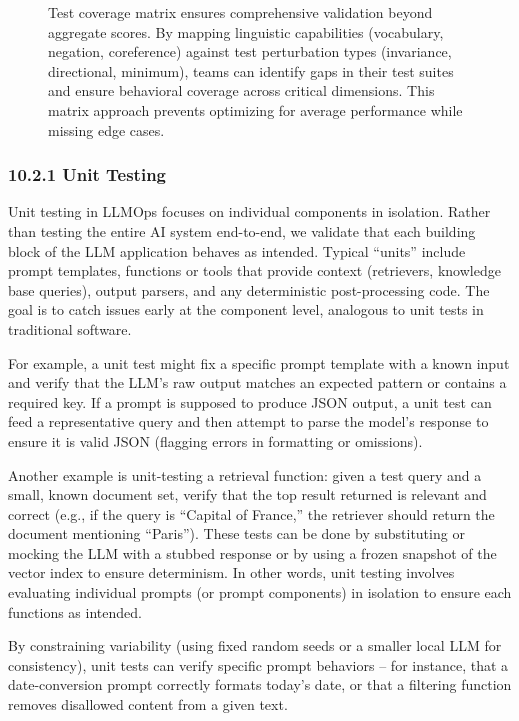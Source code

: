 \begin{figure}[t]
\begin{llmfigbox}
\begin{tikzpicture}[font=\normalsize, node distance=10mm]
\end{tikzpicture}
\end{llmfigbox}
\caption{Test coverage matrix ensures comprehensive validation beyond aggregate scores. By mapping linguistic capabilities (vocabulary, negation, coreference) against test perturbation types (invariance, directional, minimum), teams can identify gaps in their test suites and ensure behavioral coverage across critical dimensions. This matrix approach prevents optimizing for average performance while missing edge cases.}
\label{fig:ch10_test_coverage_matrix}
\end{figure}

\subsubsection*{10.2.1 Unit Testing}
Unit testing in LLMOps focuses on individual components in isolation. Rather than testing the entire AI system end-to-end, we validate that each building block of the LLM application behaves as intended. Typical “units” include prompt templates, functions or tools that provide context (retrievers, knowledge base queries), output parsers, and any deterministic post-processing code. The goal is to catch issues early at the component level, analogous to unit tests in traditional software.  

For example, a unit test might fix a specific prompt template with a known input and verify that the LLM’s raw output matches an expected pattern or contains a required key. If a prompt is supposed to produce JSON output, a unit test can feed a representative query and then attempt to parse the model’s response to ensure it is valid JSON (flagging errors in formatting or omissions).  

Another example is unit-testing a retrieval function: given a test query and a small, known document set, verify that the top result returned is relevant and correct (e.g., if the query is “Capital of France,” the retriever should return the document mentioning “Paris”). These tests can be done by substituting or mocking the LLM with a stubbed response or by using a frozen snapshot of the vector index to ensure determinism. In other words, unit testing involves evaluating individual prompts (or prompt components) in isolation to ensure each functions as intended.

By constraining variability (using fixed random seeds or a smaller local LLM for consistency), unit tests can verify specific prompt behaviors – for instance, that a date-conversion prompt correctly formats today’s date, or that a filtering function removes disallowed content from a given text.  

